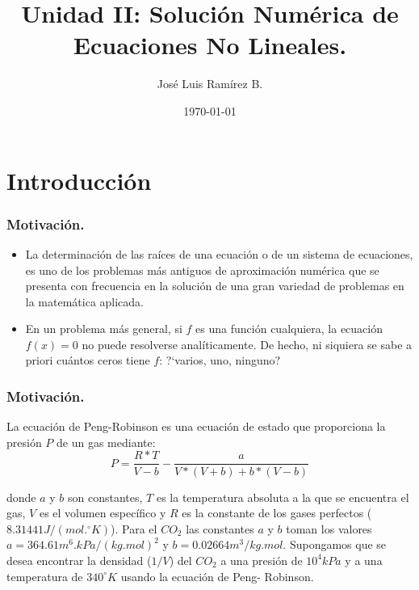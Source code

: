 \documentclass{beamer}
\title{Unidad II: Soluci\'on Num\'erica de Ecuaciones No Lineales.}
\author{Jos\'e Luis Ram\'irez B.}
\date{\today}
\begin{document}
\frame{\titlepage}

\frame{\tableofcontents}

\section{Introducci\'on}
\begin{frame}[fragile]
  \frametitle{Motivaci\'on.} 
  \begin{itemize}
    \item<1-> La determinaci\'on de las ra\'ices de una ecuaci\'on o de un sistema de ecuaciones, es uno de los problemas m\'as antiguos de aproximaci\'on num\'erica que se presenta con frecuencia en la soluci\'on de una gran variedad de problemas en la matem\'atica aplicada.
    \item En un problema m\'as general, si $f$ es una funci\'on cualquiera, la ecuaci\'on $f(x)=0$ no puede resolverse anal\'iticamente. De hecho, ni siquiera se sabe a priori cu\'antos ceros tiene $f$: ?`varios, uno, ninguno? 
  \end{itemize}    
\end{frame}
\frame
{
  \frametitle{Motivaci\'on.}
 La ecuaci\'on de Peng-Robinson es una ecuaci\'on de
estado que proporciona la presi\'on $P$ de un gas mediante:
  \begin{equation}
   P=\frac{R*T}{V-b}- \frac{a}{V*(V+b)+b*(V-b)}
  \end{equation}

donde $a$ y $b$ son constantes, $T$ es la temperatura absoluta a la que se encuentra el gas, $V$ es el volumen espec\'ifico y $R$ es la constante de los gases perfectos ($8.31441 J/(mol.^\circ K)$). Para el $CO_2$ las constantes $a$ y $b$ toman los valores $a=364.61 m^6.kPa/(kg.mol)^2$ y $b=0.02664 m^3/kg.mol$. Supongamos que se desea encontrar la densidad ($1/V$) del $CO_2$ a una presi\'on de $10^4 kPa$ y a una temperatura de $340^\circ K$ usando la ecuaci\'on de Peng- Robinson.
}
\end{document}
